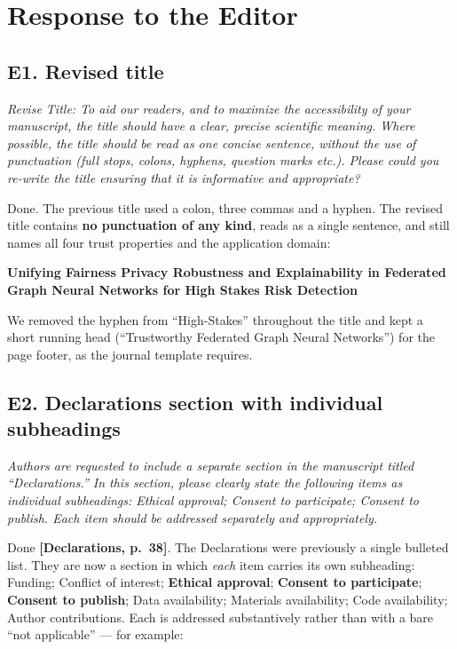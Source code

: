 \documentclass[11pt,a4paper]{article}
\newenvironment{comment}
  {\begin{mdframed}[backgroundcolor=quotegray,linewidth=0pt,skipabove=8pt,
    skipbelow=6pt,innertopmargin=6pt,innerbottommargin=6pt]\itshape}
  {\end{mdframed}}
\newenvironment{newtextbox}
  {\begin{mdframed}[linecolor=newtext!45,linewidth=0.8pt,skipabove=6pt,
    skipbelow=8pt,innertopmargin=6pt,innerbottommargin=6pt]\small}
  {\end{mdframed}}
\newcommand{\where}[1]{\textcolor{revblue}{\textbf{[#1]}}}
\begin{document}
\section{Response to the Editor}

\subsection*{E1. Revised title}

\begin{comment}
Revise Title: To aid our readers, and to maximize the accessibility of your
manuscript, the title should have a clear, precise scientific meaning. Where
possible, the title should be read as one concise sentence, without the use of
punctuation (full stops, colons, hyphens, question marks etc.). Please could you
re-write the title ensuring that it is informative and appropriate?
\end{comment}

Done. The previous title used a colon, three commas and a hyphen. The revised
title contains \textbf{no punctuation of any kind}, reads as a single sentence,
and still names all four trust properties and the application domain:

\begin{newtextbox}
\textbf{Unifying Fairness Privacy Robustness and Explainability in Federated
Graph Neural Networks for High Stakes Risk Detection}
\end{newtextbox}

We removed the hyphen from ``High-Stakes'' throughout the title and kept a short
running head (``Trustworthy Federated Graph Neural Networks'') for the page
footer, as the journal template requires.

\subsection*{E2. Declarations section with individual subheadings}

\begin{comment}
Authors are requested to include a separate section in the manuscript titled
``Declarations.'' In this section, please clearly state the following items as
individual subheadings: Ethical approval; Consent to participate; Consent to
publish. Each item should be addressed separately and appropriately.
\end{comment}

Done \where{Declarations, p.~38}. The Declarations were previously a single
bulleted list. They are now a section in which \emph{each} item carries its own
subheading: Funding; Conflict of interest; \textbf{Ethical approval};
\textbf{Consent to participate}; \textbf{Consent to publish}; Data availability;
Materials availability; Code availability; Author contributions. Each is
addressed substantively rather than with a bare ``not applicable'' --- for
example:
\end{document}
